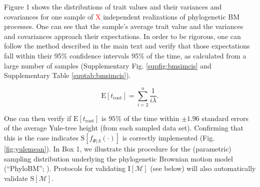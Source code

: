 \documentclass[oneside]{article}
\begin{document}
\begin{tcolorbox}[breakable, width=\textwidth, colback=gray!10, boxrule=0pt,
  title=Box 1: Models characterized by well-known parametric distributions, fonttitle=\bfseries]
Figure 1 shows the distributions of trait values and their variances and covariances for one sample of \textcolor{red}{X} independent realizations of phylogenetic BM processes. 
One can see that the sample's average trait value and the variances and covariances approach their expectations. 
In order to be rigorous, one can follow the method described in the main text and verify that those expectations fall within their 95\% confidence intervals 95\% of the time, as calculated from a large number of samples (Supplementary Fig. \ref{supfig:bmsimcis} and Supplementary Table \ref{suptab:bmsimcis}).
%
%
\end{tcolorbox}

\begin{equation}
  \text{E}[t_{\text{root}}] = \sum_{i=2}^{n}\frac{1}{i\lambda}.
  \label{eq:yule}
\end{equation}

\noindent One can then verify if $\text{E}[t_{\text{root}}]$ is $95\%$ of the time within $\pm 1.96$ standard errors of the average Yule-tree height (from each sampled data set).
Confirming that this is the case indicates $\text{S}[f_{\Phi|\Lambda}(\cdot)]$ is correctly implemented (Fig. \ref{fig:yulemean}).
In Box 1, we illustrate this procedure for the (parametric) sampling distribution underlying the phylogenetic Brownian motion model (``PhyloBM''; \citealp{felsenstein73}).
Protocols for validating $\text{I}[\mathcal{M}]$ (see below) will also automatically validate $\text{S}[\mathcal{M}]$.
\end{document}
